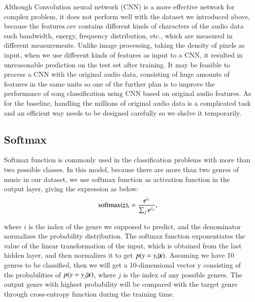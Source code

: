 \documentclass{article}
\def\mathbi#1{\textbf{\em #1}}
\begin{document}
Although Convolution neural network (CNN) is a more effective network for complex problem, it does not perform well with the dataset we introduced above, because the features.csv contains different kinds of characters of the audio data such bandwidth, energy, frequency distribution, etc., which are measured in different measurements. Unlike image processing, taking the density of pixels as input, when we use different kinds of features as input to a CNN, it resulted in unreasonable prediction on the test set after training. It may be feasible to process a CNN with the original audio data, consisting of huge amounts of features in the same units so one of the further plan is to improve the performance of song classification using CNN based on original audio features. As for the baseline, handling the millions of original audio data is a complicated task and an efficient way needs to be designed carefully so we shelve it temporarily. 

\subsection{Softmax}
Softmax function is commonly used in the classification problems with more than two possible classes. In this model, because there are more than two genres of music in our dataset, we use softmax function as activation function in the output layer, giving the expression as below:
\begin{equation}
	\mathrm{softmax}(\mathbi{z})_i=\frac{e^{z_i}}{\sum_j e^{z_j}},
\end{equation}

where $i$ is the index of the genre we supposed to predict, and the denominator normalizes the probability distribution. The softmax function exponentiates the value of the linear transformation of the input, which is obtained from the last hidden layer, and then normalizes it to get ${p(y=y_i|\mathbi{x})}$. Assuming we have 10 genres to be classified, then we will get a 10-dimensional vector y consisting of the probabilities of $p(y=y_j|\mathbi{x})$, where $j$ is the index of any possible genres. The output genre with highest probability will be compared with the target genre through cross-entropy function during the training time.
\end{document}
